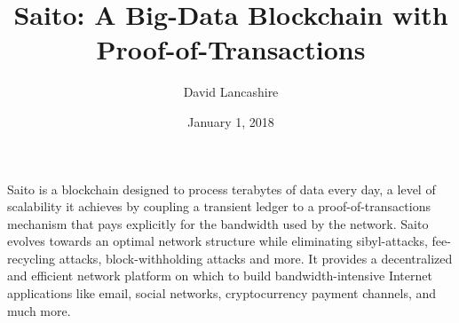 \documentclass[12pt, oneside]{article}   	%
\title{Saito: A Big-Data Blockchain with Proof-of-Transactions}
\author{David Lancashire}
\date{January 1, 2018}
\begin{document}
\maketitle




\begin{onecolabstract}
Saito is a blockchain designed to process terabytes of data every day, a level of scalability it achieves by coupling a transient ledger to a proof-of-transactions mechanism that pays explicitly for the bandwidth used by the network. Saito evolves towards an optimal network structure while eliminating sibyl-attacks, fee-recycling attacks, block-withholding attacks and more. It provides a decentralized and efficient network platform on which to build bandwidth-intensive Internet applications like email, social networks, cryptocurrency payment channels, and much more.
\end{onecolabstract}
\end{document}
